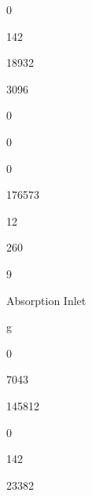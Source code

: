 \documentclass[a4paper,portrait,12pt]{article}
\begin{document}
0





142





18932





3096





0





0





0





176573





12





260





9





\begin{flushleft}
Absorption Inlet
\end{flushleft}





\begin{flushleft}
g
\end{flushleft}





0





7043





145812





0





142





23382
\end{document}
